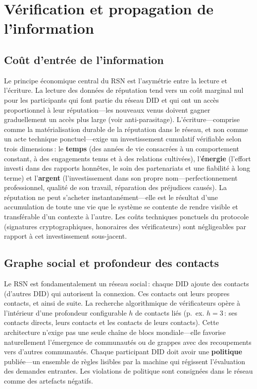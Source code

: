 \documentclass[11pt,a4paper,twocolumn]{article}
\begin{document}
\section{Vérification et propagation de l'information}

\subsection{Coût d'entrée de l'information}

Le principe économique central du RSN est l'asymétrie entre la lecture et l'écriture. La lecture des données de réputation tend vers un coût marginal nul pour les participants qui font partie du réseau DID et qui ont un accès proportionnel à leur réputation---les nouveaux venus doivent gagner graduellement un accès plus large (voir anti-parasitage). L'écriture---comprise comme la matérialisation durable de la réputation dans le réseau, et non comme un acte technique ponctuel---exige un investissement cumulatif vérifiable selon trois dimensions\,: le \textbf{temps} (des années de vie consacrées à un comportement constant, à des engagements tenus et à des relations cultivées), l'\textbf{énergie} (l'effort investi dans des rapports honnêtes, le soin des partenariats et une fiabilité à long terme) et l'\textbf{argent} (l'investissement dans son propre nom---perfectionnement professionnel, qualité de son travail, réparation des préjudices causés). La réputation ne peut s'acheter instantanément---elle est le résultat d'une accumulation de toute une vie que le système se contente de rendre visible et transférable d'un contexte à l'autre. Les coûts techniques ponctuels du protocole (signatures cryptographiques, honoraires des vérificateurs) sont négligeables par rapport à cet investissement sous-jacent.

\subsection{Graphe social et profondeur des contacts}

Le RSN est fondamentalement un réseau social\,: chaque DID ajoute des contacts (d'autres DID) qui autorisent la connexion. Ces contacts ont leurs propres contacts, et ainsi de suite. La recherche algorithmique de vérificateurs opère à l'intérieur d'une profondeur configurable $h$ de contacts liés (p.~ex. $h=3$\,: ses contacts directs, leurs contacts et les contacts de leurs contacts). Cette architecture n'exige pas une seule chaîne de blocs mondiale---elle favorise naturellement l'émergence de communautés ou de grappes avec des recoupements vers d'autres communautés. Chaque participant DID doit avoir une \textbf{politique} publiée---un ensemble de règles lisibles par la machine qui régissent l'évaluation des demandes entrantes. Les violations de politique sont consignées dans le réseau comme des artefacts négatifs.
\end{document}
